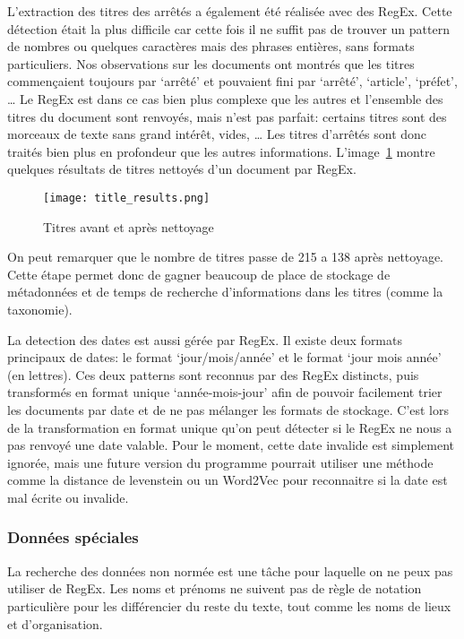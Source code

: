L'extraction des titres des arrêtés a également été réalisée avec des RegEx.
Cette détection était la plus difficile car cette fois il ne suffit pas de trouver un pattern de nombres ou quelques caractères mais des phrases entières, sans formats particuliers.
Nos observations sur les documents ont montrés que les titres commençaient toujours par `arrêté' et pouvaient fini par `arrêté', `article', `préfet', \ldots
Le RegEx est dans ce cas bien plus complexe que les autres et l'ensemble des titres du document sont renvoyés, mais n'est pas parfait: certains titres sont des morceaux de texte sans grand intérêt, vides, \ldots
Les titres d'arrêtés sont donc traités bien plus en profondeur que les autres informations.
L'image~\ref{fig:regexTitles} montre quelques résultats de titres nettoyés d'un document par RegEx.

\begin{figure}[h!]
  \centering
  \texttt{[image: title\_results.png]}
	\caption[]{Titres avant et après nettoyage}
	\label{fig:regexTitles}
\end{figure}

On peut remarquer que le nombre de titres passe de 215 a 138 après nettoyage.
Cette étape permet donc de gagner beaucoup de place de stockage de métadonnées et de temps de recherche d'informations dans les titres (comme la taxonomie).


La detection des dates est aussi gérée par RegEx.
Il existe deux formats principaux de dates: le format `jour/mois/année' et le format `jour mois année' (en lettres).
Ces deux patterns sont reconnus par des RegEx distincts, puis transformés en format unique `année-mois-jour' afin de pouvoir facilement trier les documents par date et de ne pas mélanger les formats de stockage.
C'est lors de la transformation en format unique qu'on peut détecter si le RegEx ne nous a pas renvoyé une date valable.
Pour le moment, cette date invalide est simplement ignorée, mais une future version du programme pourrait utiliser une méthode comme la distance de levenstein ou un Word2Vec pour reconnaitre si la date est mal écrite ou invalide.




\subsubsection{Données spéciales}
La recherche des données non normée est une tâche pour laquelle on ne peux pas utiliser de RegEx.
Les noms et prénoms ne suivent pas de règle de notation particulière pour les différencier du reste du texte, tout comme les noms de lieux et d'organisation.


